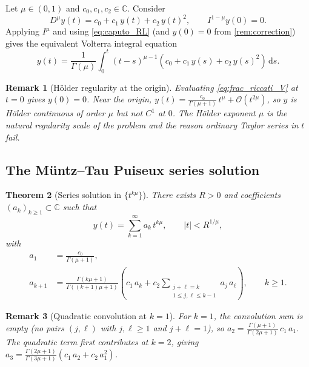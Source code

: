 \documentclass[11pt,a4paper]{article}
\newtheorem{theorem}{Theorem}[section]
\newtheorem{remark}[theorem]{Remark}
\newcommand{\C}{\mathbb{C}}
\newcommand{\dd}{\,\mathrm{d}}
\begin{document}
Let \(\mu\in(0,1)\) and \(c_0,c_1,c_2\in\C\). Consider
\begin{equation}\label{eq:frac_riccati}
D^\mu y(t)=c_0+c_1\,y(t)+c_2\,y(t)^2,\qquad I^{1-\mu}y(0)=0.
\end{equation}
Applying \(I^\mu\) and using \eqref{eq:caputo_RL} (and \(y(0)=0\) from \cref{rem:correction}) gives the equivalent Volterra integral equation
\begin{equation}\label{eq:frac_riccati_V}
y(t)
=
\frac{1}{\Gamma(\mu)}\int_0^t (t-s)^{\mu-1}\!\left(c_0+c_1\,y(s)+c_2\,y(s)^2\right)\dd s.
\end{equation}

\begin{remark}[H\"older regularity at the origin]\label{rem:regularity}
Evaluating \eqref{eq:frac_riccati_V} at \(t=0\) gives \(y(0)=0\).
Near the origin, \(y(t)=\frac{c_0}{\Gamma(\mu+1)}\,t^\mu + \mathcal{O}(t^{2\mu})\), so \(y\) is H\"older continuous of order \(\mu\) but not \(C^1\) at \(0\).
The H\"older exponent \(\mu\) is the natural regularity scale of the problem and the reason ordinary Taylor series in \(t\) fail.
\end{remark}

\subsection{The M\"untz--Tau Puiseux series solution}

\begin{theorem}[Series solution in \(\{t^{k\mu}\}\)]\label{thm:riccati_series}
There exists \(R>0\) and coefficients \((a_k)_{k\ge1}\subset\C\) such that
\begin{equation}\label{eq:y_series}
y(t)=\sum_{k=1}^{\infty}a_k\,t^{k\mu},\qquad |t|<R^{1/\mu},
\end{equation}
with
\begin{align}
a_1 &= \frac{c_0}{\Gamma(\mu+1)},\label{eq:a1_const}\\[4pt]
a_{k+1} &= \frac{\Gamma(k\mu+1)}{\Gamma((k+1)\mu+1)}
\left(c_1\,a_k+c_2\!\!\sum_{\substack{j+\ell=k\\1\le j,\ell\le k-1}}\!\!a_j\,a_\ell\right),\qquad k\ge1.\label{eq:ak_const}
\end{align}
\end{theorem}

\begin{remark}[Quadratic convolution at \(k=1\)]\label{rem:conv_k1}
For \(k=1\), the convolution sum is empty (no pairs \((j,\ell)\) with \(j,\ell\ge1\) and \(j+\ell=1\)), so \(a_2 = \frac{\Gamma(\mu+1)}{\Gamma(2\mu+1)}\,c_1\,a_1\).
The quadratic term first contributes at \(k=2\), giving \(a_3 = \frac{\Gamma(2\mu+1)}{\Gamma(3\mu+1)}(c_1\,a_2 + c_2\,a_1^2)\).
\end{remark}
\end{document}

